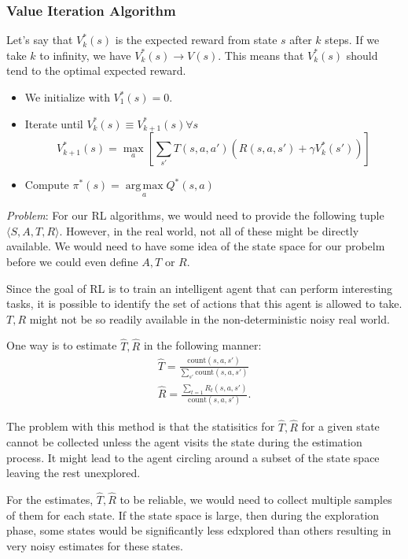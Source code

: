 \documentclass{article}
\DeclareMathOperator*{\argmax}{arg\,max}
\begin{document}
\subsubsection{Value Iteration Algorithm}
Let's say that $V_k^*(s)$ is the expected reward from state $s$ after $k$ steps.
If we take $k$ to infinity, we have $V_k^*(s)\rightarrow V(s)$. This means that $V_k^*(s)$ should tend to the optimal expected reward.

\begin{itemize}
	\item We initialize with $V_1^*(s)=0$.
	\item Iterate until $V_k^*(s)\equiv V_{k+1}^*(s)\forall s$
		$$V_{k+1}^*(s)=\max_a\left[\sum\limits_{s'}T(s,a,a')\left(R(s,a,s')+\gamma V_k^*(s')\right)\right]$$
	\item Compute $\pi^*(s)=\argmax\limits_a{Q^*(s,a)}$
\end{itemize}

\emph{Problem}: For our RL algorithms, we would need to provide the following tuple $\langle S,A,T,R\rangle$. However, in the real world, not all of these might be directly available. We would need to have some idea of the state space for our probelm before we could even define $A,T$ or $R$.

Since the goal of RL is to train an intelligent agent that can perform interesting tasks, it is possible to identify the set of actions that this agent is allowed to take. $T,R$ might not be so readily available in the non-deterministic noisy real world.

One way is to estimate $\hat{T},\hat{R}$ in the following manner:
\begin{align*}
	\hat{T}=\frac{\text{count}(s,a,s')}{\sum\limits_{s'}\text{count}(s,a,s')}\\
	\hat{R}=\frac{\sum\limits_{t=1}R_t(s,a,s')}{\text{count}(s,a,s')}.
\end{align*}

The problem with this method is that the statisitics for $\hat{T},\hat{R}$ for a given state cannot be collected unless the agent visits the state during the estimation process. It might lead to the agent circling around a subset of the state space leaving the rest unexplored.

For the estimates, $\hat{T},\hat{R}$ to be reliable, we would need to collect multiple samples of them for each state. If the state space is large, then during the exploration phase, some states would be significantly less edxplored than others resulting in very noisy estimates for these states.
\end{document}
